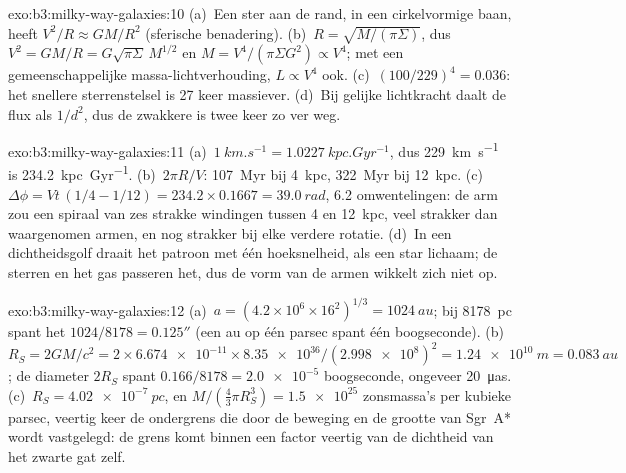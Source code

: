 \begin{solution}{exo:b3:milky-way-galaxies:10}
(a)~Een ster aan de rand, in een cirkelvormige baan, heeft $V^2/R \approx GM/R^2$
(sferische benadering). (b)~$R = \sqrt{M/(\pi\Sigma)}$, dus $V^2 =
GM/R = G\sqrt{\pi\Sigma}\,M^{1/2}$ en $M = V^4/(\pi\Sigma G^2) \propto
V^4$; met een gemeenschappelijke massa-lichtverhouding, $L \propto V^4$ ook.
(c)~$(100/229)^4 = \num{0.036}$: het snellere sterrenstelsel is 27 keer
massiever. (d)~Bij gelijke lichtkracht daalt de flux als $1/d^2$, dus de zwakkere
is twee keer zo ver weg.
\end{solution}

\begin{solution}{exo:b3:milky-way-galaxies:11}
(a)~$\qty{1}{km.s^{-1}} = \qty{1.0227}{kpc.Gyr^{-1}}$, dus
\qty{229}{km.s^{-1}} is \qty{234.2}{kpc.Gyr^{-1}}. (b)~$2\pi R/V$:
\qty{107}{Myr} bij \qty{4}{kpc}, \qty{322}{Myr} bij \qty{12}{kpc}.
(c)~$\Delta\phi = Vt\,(1/4 - 1/12) = 234.2\times0.1667 = \qty{39.0}{rad}$,
6.2 omwentelingen: de arm zou een spiraal van zes strakke windingen tussen 4 en
\qty{12}{kpc}, veel strakker dan waargenomen armen, en nog strakker bij elke
verdere rotatie. (d)~In een dichtheidsgolf draait het patroon met één
hoeksnelheid, als een star lichaam; de sterren en het gas passeren het, dus de vorm
van de armen wikkelt zich niet op.
\end{solution}

\begin{solution}{exo:b3:milky-way-galaxies:12}
(a)~$a = (4.2\times10^6\times16^2)^{1/3} = \qty{1024}{au}$; bij
\qty{8178}{pc} spant het $1024/8178 = \ang{;;0.125}$ (een au op één parsec
spant één boogseconde). (b)~$R_S = 2GM/c^2 = 2\times\num{6.674e-11}
\times\num{8.35e36}/(\num{2.998e8})^2 = \qty{1.24e10}{m} = \qty{0.083}{au}$;
de diameter $2R_S$ spant $0.166/8178 = \num{2.0e-5}$ boogseconde, ongeveer
\qty{20}{\micro as}. (c)~$R_S = \qty{4.02e-7}{pc}$, en $M/(\tfrac43\pi
R_S^3) = \num{1.5e25}$ zonsmassa's per kubieke parsec, veertig keer de
ondergrens die door de beweging en de grootte van Sgr~A* wordt vastgelegd: de grens komt binnen
een factor veertig van de dichtheid van het zwarte gat zelf.
\end{solution}

